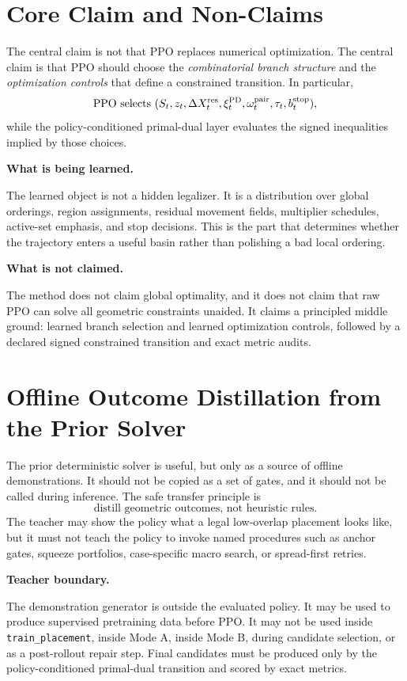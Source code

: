 \documentclass[11pt]{article}
\newcommand{\callout}[3]{%
\medskip\noindent\textbf{\textcolor{#1}{#2.}}\par\noindent #3\par\medskip
}
\begin{document}
\section{Core Claim and Non-Claims}

The central claim is not that PPO replaces numerical optimization. The central claim is that PPO should choose the \emph{combinatorial branch structure} and the \emph{optimization controls} that define a constrained transition. In particular,
\[
    \text{PPO selects }(S_t,z_t,\Delta X_t^{\rm res},\xi_t^{\rm PD},\omega_t^{\rm pair},\tau_t,b_t^{\rm stop}),
\]
while the policy-conditioned primal-dual layer evaluates the signed inequalities implied by those choices.

\callout{purple!70!black}{What is being learned}{The learned object is not a hidden legalizer. It is a distribution over global orderings, region assignments, residual movement fields, multiplier schedules, active-set emphasis, and stop decisions. This is the part that determines whether the trajectory enters a useful basin rather than polishing a bad local ordering.}

\callout{red!75!black}{What is not claimed}{The method does not claim global optimality, and it does not claim that raw PPO can solve all geometric constraints unaided. It claims a principled middle ground: learned branch selection and learned optimization controls, followed by a declared signed constrained transition and exact metric audits.}

\section{Offline Outcome Distillation from the Prior Solver}

The prior deterministic solver is useful, but only as a source of offline demonstrations. It should not be copied as a set of gates, and it should not be called during inference. The safe transfer principle is
\[
\boxed{\text{distill geometric outcomes, not heuristic rules.}}
\]
The teacher may show the policy what a legal low-overlap placement looks like, but it must not teach the policy to invoke named procedures such as anchor gates, squeeze portfolios, case-specific macro search, or spread-first retries.

\callout{orange!80!black}{Teacher boundary}{The demonstration generator is outside the evaluated policy. It may be used to produce supervised pretraining data before PPO. It may not be used inside \texttt{train\_placement}, inside Mode A, inside Mode B, during candidate selection, or as a post-rollout repair step. Final candidates must be produced only by the policy-conditioned primal-dual transition and scored by exact metrics.}
\end{document}
